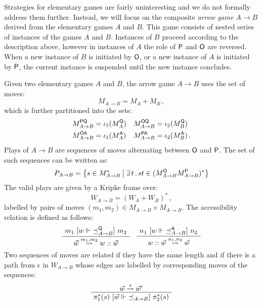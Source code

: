 Strategies for elementary games are fairly uninteresting
and we do not formally address them further.
Instead,
we will focus on the composite \emph{arrow game} $A \rightarrow B$
derived from the elementary games $A$ and $B$.
This game consists of
nested series of instances of the games $A$ and $B$.
Instances of $B$ proceed according to the description above,
however in instances of $A$ the role of $ \mathsf{P} $ and $ \mathsf{O} $
are reversed.
When a new instance of $B$ is initiated by $ \mathsf{O} $,
or a new instance of $A$ is initiated by $ \mathsf{P} $,
the current instance is suspended
until the new instance concludes.

\begin{definition}
Given two elementary games $A$ and $B$,
the arrow game $A \rightarrow B$ uses the set of moves:
\[
    M_{A \rightarrow B} = M_A + M_B \,,
\]
which is further partitioned into the sets:
\begin{align*}
    M_{A \rightarrow B}^{ \mathsf{PQ} } &= \iota_1(M_A^{ \mathsf{Q} }) &
    M_{A \rightarrow B}^{ \mathsf{OQ} } &= \iota_2(M_B^{ \mathsf{Q} }) \\
    M_{A \rightarrow B}^{ \mathsf{OA} } &= \iota_1(M_A^{ \mathsf{A} }) &
    M_{A \rightarrow B}^{ \mathsf{PA} } &= \iota_2(M_B^{ \mathsf{A} }) \,.
\end{align*}
Plays of $A \rightarrow B$ are sequences of moves
alternating between $ \mathsf{O} $ and $ \mathsf{P} $.
The set of such sequences can be written as:
\[
    P_{A \rightarrow B} =
      \left\{ s \in M_{A \rightarrow B}^* \:\middle\vert\:
         \exists \, t \,.\, s t \in
         (M_{A \rightarrow B}^{ \mathsf{O} } M_{A \rightarrow B}^{ \mathsf{P} })^* \right\}
\]
The valid plays
are given by a Kripke frame over:
\[
    W_{A \rightarrow B} = (W_A + W_B)^* \,,
\]
labelled by pairs of moves
$(m_1, m_2) \in M_{A \rightarrow B} \times M_{A \rightarrow B}$.
The accessibility relation is defined as follows:
\[
    \AxiomC{$m_1 \ifr{w \Vdash {\preceq}_{A \rightarrow B}^\kw{Q}} m_2$}
    \UnaryInfC{$\vec{w} \stackrel{m_1, m_2}{\leadsto} w :: \vec{w}$}
    \DisplayProof \quad
    \AxiomC{$n_1 \ifr{w \Vdash {\preceq}_{A \rightarrow B}^\kw{A}} n_2$}
    \UnaryInfC{$w :: \vec{w} \stackrel{n_1, n_2}{\leadsto} \vec{w}$}
    \DisplayProof
\]
Two sequences of moves are related if they have the same length
and if there is a path from $\epsilon$ in $W_{A \rightarrow B}$
whose edges are labelled by corresponding moves of the sequences:
\[
    \AxiomC{$\vec{w} \stackrel{s}{\leadsto} \vec{w}'$}
    \UnaryInfC{$\pi_1^*(s)
       \ifr{\vec{w} \Vdash {\preceq}_{A \rightarrow B}}
       \pi_2^*(s)$}
    \DisplayProof
\]
\end{definition}


